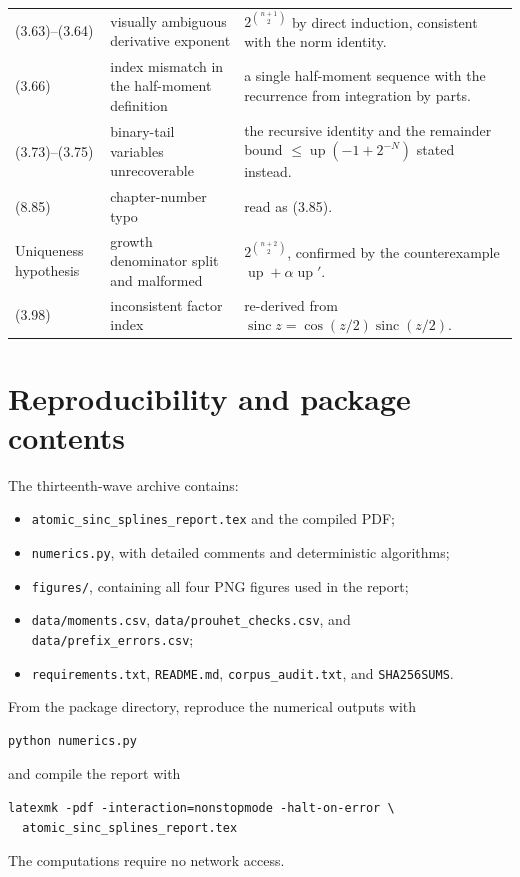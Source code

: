 \documentclass[11pt,oneside]{article}
\numberwithin{equation}{section}
\theoremstyle{definition}
\theoremstyle{remark}
\newcommand{\Up}{\operatorname{up}}
\newcommand{\sinc}{\operatorname{sinc}}
\begin{document}
\begin{longtable}{@{}p{}p{}p{}@{}}
(3.63)--(3.64) & visually ambiguous derivative exponent & $2^{\binom{n+1}2}$
by direct induction, consistent with the norm identity.\\
(3.66) & index mismatch in the half-moment definition & a single
half-moment sequence with the recurrence from integration by parts.\\
(3.73)--(3.75) & binary-tail variables unrecoverable & the recursive
identity and the remainder bound $\le\Up(-1+2^{-N})$ stated instead.\\
(8.85) & chapter-number typo & read as (3.85).\\
Uniqueness hypothesis & growth denominator split and malformed &
$2^{\binom{n+2}2}$, confirmed by the counterexample $\Up+\alpha\Up'$.\\
(3.98) & inconsistent factor index & re-derived from
$\sinc z=\cos(z/2)\sinc(z/2)$.\\
\bottomrule
\end{longtable}

\section{Reproducibility and package contents}

The thirteenth-wave archive contains:
\begin{itemize}
\item \texttt{atomic\_sinc\_splines\_report.tex} and the compiled PDF;
\item \texttt{numerics.py}, with detailed comments and deterministic algorithms;
\item \texttt{figures/}, containing all four PNG figures used in the report;
\item \texttt{data/moments.csv}, \texttt{data/prouhet\_checks.csv}, and
\texttt{data/prefix\_errors.csv};
\item \texttt{requirements.txt}, \texttt{README.md},
\texttt{corpus\_audit.txt}, and \texttt{SHA256SUMS}.
\end{itemize}

From the package directory, reproduce the numerical outputs with
\begin{lstlisting}[style=repoPython]
python numerics.py
\end{lstlisting}
and compile the report with
\begin{lstlisting}[style=repoPython]
latexmk -pdf -interaction=nonstopmode -halt-on-error \
  atomic_sinc_splines_report.tex
\end{lstlisting}
The computations require no network access.
\end{document}
